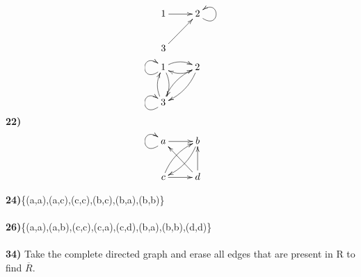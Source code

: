 \documentclass{article}
\begin{document}
\begin{displaymath}
    \xymatrix{1 \ar[r] & 2\ar@(dr,ur) \\
              3 \ar[ur] }
\end{displaymath}
\begin{displaymath}
    \xymatrix{1 \ar@/^/[d]\ar@/^/[r]\ar@(dl,ul) & 2\ar@/^/[dl] \ar@/^/[l] \\
              3 \ar@/^/[u]\ar@/^/[ur]\ar@(dl,ul) }

\end{displaymath}
\textbf{22)}
\begin{displaymath}
    \xymatrix{a \ar[r] \ar@(dl,ul) & b\ar@/^/[dl] \\
              c \ar[r]\ar@/^/[ur] & d\ar[ul]\ar[u] }

\end{displaymath}

\textbf{24)}\{(a,a),(a,c),(c,c),(b,c),(b,a),(b,b)\}
\\\\
\textbf{26)}\{(a,a),(a,b),(c,c),(c,a),(c,d),(b,a),(b,b),(d,d)\}
\\\\
\textbf{34)} Take the complete directed graph and erase all edges that are present in R to find $\overline{R}$.
\\\\
\end{document}
